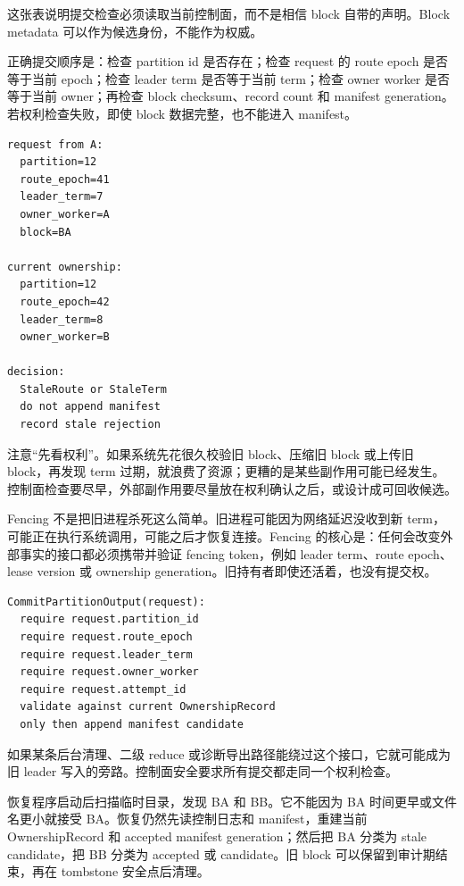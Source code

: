 这张表说明提交检查必须读取当前控制面，而不是相信 block 自带的声明。Block metadata 可以作为候选身份，不能作为权威。

正确提交顺序是：检查 partition id 是否存在；检查 request 的 route epoch 是否等于当前 epoch；检查 leader term 是否等于当前 term；检查 owner worker 是否等于当前 owner；再检查 block checksum、record count 和 manifest generation。若权利检查失败，即使 block 数据完整，也不能进入 manifest。

\begin{lstlisting}[numbers=none,caption={旧 leader 提交判定}]
request from A:
  partition=12
  route_epoch=41
  leader_term=7
  owner_worker=A
  block=BA

current ownership:
  partition=12
  route_epoch=42
  leader_term=8
  owner_worker=B

decision:
  StaleRoute or StaleTerm
  do not append manifest
  record stale rejection
\end{lstlisting}

注意“先看权利”。如果系统先花很久校验旧 block、压缩旧 block 或上传旧 block，再发现 term 过期，就浪费了资源；更糟的是某些副作用可能已经发生。控制面检查要尽早，外部副作用要尽量放在权利确认之后，或设计成可回收候选。

Fencing 不是把旧进程杀死这么简单。旧进程可能因为网络延迟没收到新 term，可能正在执行系统调用，可能之后才恢复连接。Fencing 的核心是：任何会改变外部事实的接口都必须携带并验证 fencing token，例如 leader term、route epoch、lease version 或 ownership generation。旧持有者即使还活着，也没有提交权。

\begin{lstlisting}[numbers=none,caption={fencing token 的接口边界}]
CommitPartitionOutput(request):
  require request.partition_id
  require request.route_epoch
  require request.leader_term
  require request.owner_worker
  require request.attempt_id
  validate against current OwnershipRecord
  only then append manifest candidate
\end{lstlisting}

如果某条后台清理、二级 reduce 或诊断导出路径能绕过这个接口，它就可能成为旧 leader 写入的旁路。控制面安全要求所有提交都走同一个权利检查。

恢复程序启动后扫描临时目录，发现 BA 和 BB。它不能因为 BA 时间更早或文件名更小就接受 BA。恢复仍然先读控制日志和 manifest，重建当前 OwnershipRecord 和 accepted manifest generation；然后把 BA 分类为 stale candidate，把 BB 分类为 accepted 或 candidate。旧 block 可以保留到审计期结束，再在 tombstone 安全点后清理。

